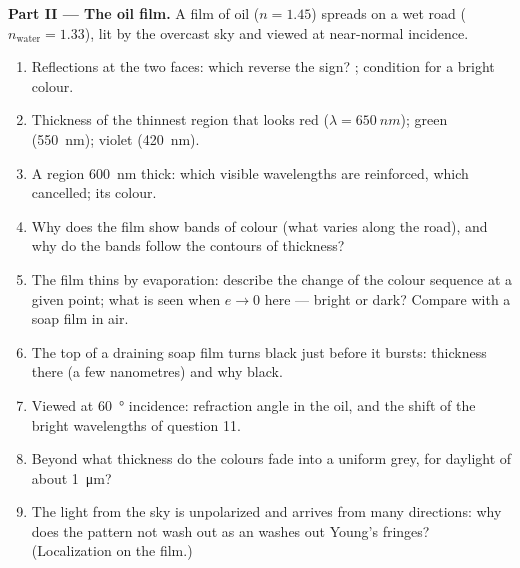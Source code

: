 \begin{problem}
\medskip
\noindent\textbf{Part II --- The oil film.}
A film of oil ($n = 1.45$) spreads on a wet road ($n_{\text{water}} = 1.33$),
lit by the overcast sky and viewed at near-normal incidence.
\begin{enumerate}[resume]
  \item Reflections at the two faces: which reverse the sign? ; condition for a bright colour.
  \item Thickness of the thinnest region that looks red ($\lambda =
        \qty{650}{nm}$); green (\qty{550}{nm}); violet (\qty{420}{nm}).
  \item A region \qty{600}{nm} thick: which visible wavelengths are
        reinforced, which cancelled; its colour.
  \item Why does the film show bands of colour (what varies along the
        road), and why do the bands follow the contours of thickness?
  \item The film thins by evaporation: describe the change of the
        colour sequence at a given point; what is seen when $e \to 0$
        here --- bright or dark? Compare with a soap film in air.
  \item The top of a draining soap film turns black just before it
        bursts: thickness there (a few nanometres) and why black.
  \item Viewed at \qty{60}{\degree} incidence: refraction angle in the oil,
        and the shift of the bright wavelengths of question 11.
  \item Beyond what thickness do the colours fade into a uniform
        grey, for daylight of  about \qty{1}{\micro m}?
  \item The light from the sky is unpolarized and arrives from many
        directions: why does the pattern not wash out as an  washes out Young's fringes? (Localization on the film.)
\end{enumerate}


\end{problem}

